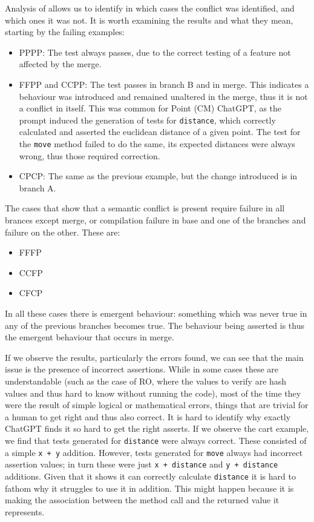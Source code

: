 Analysis of  allows us to identify in which cases the conflict was identified, and which ones it was not.
It is worth examining the results and what they mean, starting by the failing examples:
%
\begin{itemize}
  \item PPPP: The test always passes, due to the correct testing of a feature not affected by the merge.

  \item FFPP and CCPP: The test passes in branch B and in merge. This indicates a behaviour was introduced and remained unaltered in the merge, thus it is not a conflict in itself.
  This was common for Point (CM) ChatGPT, as the prompt induced the generation of tests for \texttt{distance}, which correctly calculated and asserted the euclidean distance of a given point.  The test for the \texttt{move} method failed to do the same, its expected distances were always wrong, thus those required correction.

  \item CPCP: The same as the previous example, but the change introduced is in branch A.
\end{itemize}
%
The cases that show that a semantic conflict is present require failure in all brances except merge, or compilation failure in base and one of the branches and failure on the other.
These are:
\begin{itemize}
  \item FFFP
  \item CCFP
  \item CFCP
\end{itemize}
%
In all these cases there is emergent behaviour: something which was never true in any of the previous branches becomes true. The behaviour being asserted is thus the
emergent behaviour that occurs in merge.

If we observe the results, particularly the errors found, we can see that the main issue is the presence
of incorrect assertions. While in some cases these are understandable (such as the case of RO,
where the values to verify are hash values and thus hard to know without running the code), most of the time
they were the result of simple logical or mathematical errors, things that are trivial for a human to get right
and thus also correct.
It is hard to identify why exactly ChatGPT finds it so hard to get the right asserts. If we observe the cart example,
we find that tests generated for \texttt{distance} were always correct. These consisted of a simple \texttt{x + y} addition.
However, tests generated for \texttt{move} always had incorrect assertion values; in turn these were just \texttt{x + distance} and \texttt{y + distance} additions.
Given that it shows it can correctly calculate \texttt{distance} it is hard to fathom why it struggles
to use it in addition. This might happen because it is making the association between the method call and the returned value it represents.

